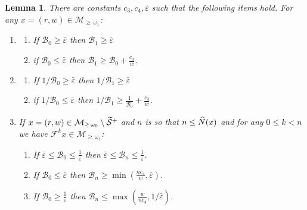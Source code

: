 \documentclass[10pt]{amsart}
\newtheorem{lemm}[theo]{Lemma}\newtheorem{prop}[theo]{Proposition}\newtheorem{coro}[theo]{Corollary}\newtheorem{conj}[theo]{Conjecture}
\theoremstyle{definition}\newtheorem{defi}[theo]{Definition}\newtheorem{rema}[theo]{Remark}\newtheorem{exam}[theo]{Example}\newtheorem{exem}[theo]{Example}\newtheorem{nota}[theo]{Notation}
\newcommand{\ct}{r}
\newcommand{\ifrac}[2]{#1/#2}
\newcommand{\cB}{\mathcal{B}}
\newcommand{\pslope}{\mathcal{B}}
\newcommand{\cm}{\mathcal{F}}
\newcommand{\csp}{\mathcal{M}}
\newcommand{\cspl}[1]{\csp_{\ge\,#1}}
\newcommand{\breps}{\bar{\varepsilon}}
\newcommand{\ppPrivate}[2]{#1^{#2}}
\newcommand{\prePrivate}[1]{\ppPrivate{#1}{-}}
\newcommand{\prpslope}{\prePrivate{\pslope}}
\newcommand{\singPrivate}{\mathcal{S}}
\newcommand{\singt}[1]{\tilde{\singPrivate}^{#1}}
\newcommand{\llw}{\stackunder[1.2pt]{$w$}{\rule{.8ex}{.075ex}}}
\newcommand{\law}[1]{\omega_{#1}}
\newcommand{\Np}{\hat N}
\renewcommand{\prpslope}{\cB}
\renewcommand{\llw}{\law{1}}
\renewcommand{\prpslope}{\cB}
\renewcommand{\prpslope}{\cB}
\newcommand*{\relabel}{\renewcommand{\labelenumi}{(\theenumi)}}
\newcommand*{\relabell}{\renewcommand{\labelenumii}{(\theenumii)}}
\newcommand*{\romanenumii}{\renewcommand*{\theenumii}{\roman{enumii}}\relabell}
\newcommand*{\alphenumi}{\renewcommand*{\theenumi}{\alph{enumi}}\relabel}
\let\oldtilde\tilde
\renewcommand*{\tilde}[1]{\mathchoice{\widetilde{#1}}{\widetilde{#1}}{\oldtilde{#1}}{\oldtilde{#1}}}
\let\oldhat\hat
\renewcommand*{\hat}[1]{\mathchoice{\widehat{#1}}{\widehat{#1}}{\oldhat{#1}}{\oldhat{#1}}}
\begin{document}
\begin{lemm}\label{LmPSlopeHighEnergy}
There are constants $c_3, c_{4}, \breps$ such that the following items hold. For any $x = (\ct,w)\in\cspl{\llw}$:
\begin{enumerate}\alphenumi
\item\label{i_highEnergyBelow}
\begin{enumerate}\romanenumii
\item\label{lemm4.13.a.1} If $\prpslope_{0}\geq \breps$ then $\prpslope_{1}\geq \breps$
\item\label{lemm4.13.a.2} if $\prpslope_{0}\leq \breps$ then $\prpslope_{1}\geq \prpslope_{0}+\frac{c_3}{w}. $
\end{enumerate}
\item\label{i_highEnergyAbove}
\begin{enumerate}\romanenumii
\item\label{lemm4.13.b.1} If $\ifrac{1}{\prpslope_{0}} \geq \breps$ then $\ifrac{1}{\prpslope_{1}}\geq \breps$
\item\label{lemm4.13.b.2} if $\ifrac{1}{\prpslope_{0}}\leq \breps$ then $\ifrac{1}{\prpslope_{1}}\geq
\frac{1}{\prpslope_{0}}+\frac{c_3}{w}$.
\end{enumerate}
\item\label{i_highEnergySqueeze}
If $x = (\ct,w)\in\cspl{\law{0}}\setminus\singt+$ and $n$ is so that $n\leq \Np(x)$ and for any $0\le k < n$ we have $\cm^{k}x\in\cspl{\llw}$:
\begin{enumerate}\romanenumii
\item\label{lemm4.13.c.1} If $\breps\leq \prpslope_0\leq \frac{1}{\breps}$ then $\breps\leq \prpslope_n\leq \frac{1}{\breps}$.
\item\label{lemm4.13.c.2} If $\prpslope_0\le\breps$ then $\prpslope_n\geq \min(\frac{n c_4}{w}, \breps)$.
\item\label{lemm4.13.c.3} If $\prpslope_0\geq \frac{1 }{\breps}$ then $\prpslope_n\leq \max(\frac{w}{n c_4}, 1/\breps)$.
\end{enumerate}
\end{enumerate}
\end{lemm}
\end{document}
